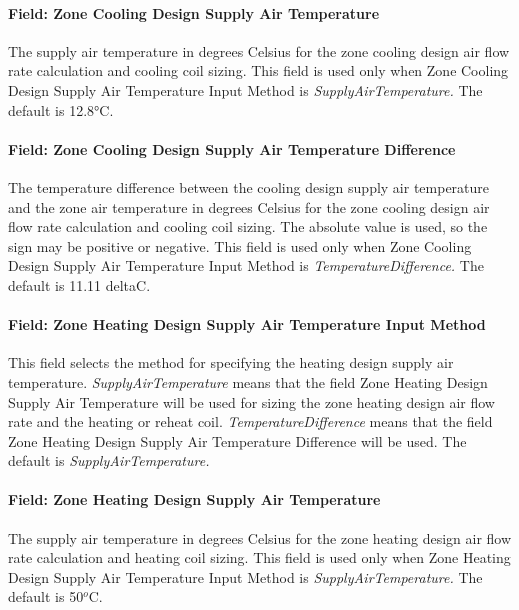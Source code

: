 \paragraph{Field: Zone Cooling Design Supply Air Temperature}\label{field-zone-cooling-design-supply-air-temperature-5}

The supply air temperature in degrees Celsius for the zone cooling design air flow rate calculation and cooling coil sizing. This field is used only when Zone Cooling Design Supply Air Temperature Input Method is \emph{SupplyAirTemperature.} The default is 12.8°C.

\paragraph{Field: Zone Cooling Design Supply Air Temperature Difference}\label{field-zone-cooling-design-supply-air-temperature-difference-6}

The temperature difference between the cooling design supply air temperature and the zone air temperature in degrees Celsius for the zone cooling design air flow rate calculation and cooling coil sizing. The absolute value is used, so the sign may be positive or negative. This field is used only when Zone Cooling Design Supply Air Temperature Input Method is \emph{TemperatureDifference.} The default is 11.11 deltaC.

\paragraph{Field: Zone Heating Design Supply Air Temperature Input Method}\label{field-zone-heating-design-supply-air-temperature-input-method-6}

This field selects the method for specifying the heating design supply air temperature. \emph{SupplyAirTemperature} means that the field Zone Heating Design Supply Air Temperature will be used for sizing the zone heating design air flow rate and the heating or reheat coil. \emph{TemperatureDifference} means that the field Zone Heating Design Supply Air Temperature Difference will be used. The default is \emph{SupplyAirTemperature.}

\paragraph{Field: Zone Heating Design Supply Air Temperature}\label{field-zone-heating-design-supply-air-temperature-5}

The supply air temperature in degrees Celsius for the zone heating design air flow rate calculation and heating coil sizing. This field is used only when Zone Heating Design Supply Air Temperature Input Method is \emph{SupplyAirTemperature.} The default is 50\(^{o}\)C.

